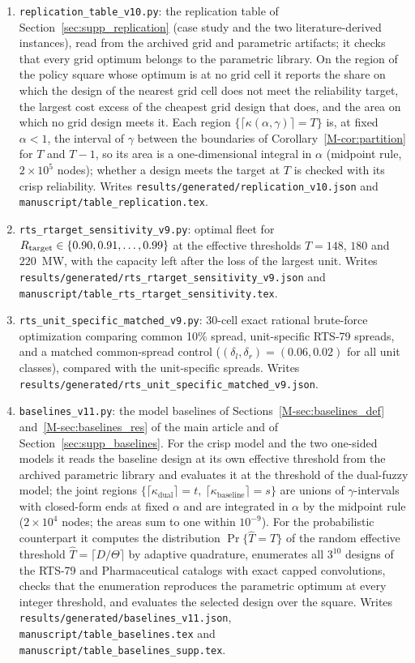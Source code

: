 \documentclass[11pt]{article}
\newcommand{\new}[1]{#1}
\begin{document}
\begin{enumerate}
\item \texttt{replication\_table\_v10.py}: the replication table of Section~\ref{sec:supp_replication} (case study and the two literature-derived instances), read from the archived grid and parametric artifacts; it checks that every grid optimum belongs to the parametric library. On the region of the policy square whose optimum is at no grid cell it reports the share on which the design of the nearest grid cell does not meet the reliability target, the largest cost excess of the cheapest grid design that does, and the area on which no grid design meets it. Each region $\{\lceil\kappa(\alpha,\gamma)\rceil = T\}$ is, at fixed $\alpha<1$, the interval of $\gamma$ between the boundaries of Corollary~\ref*{M-cor:partition} for $T$ and $T-1$, so its area is a one-dimensional integral in $\alpha$ (midpoint rule, $2\times10^5$ nodes); whether a design meets the target at $T$ is checked with its crisp reliability. Writes \texttt{results/generated/replication\_v10.json} and \texttt{manuscript/table\_replication.tex}.
\item \new{\texttt{rts\_rtarget\_sensitivity\_v9.py}: optimal fleet for $R_{\mathrm{target}} \in \{0.90, 0.91, \dots, 0.99\}$ at the effective thresholds $T = 148$, $180$ and $220$~MW, with the capacity left after the loss of the largest unit. Writes \texttt{results/generated/rts\_rtarget\_sensitivity\_v9.json} and \texttt{manuscript/table\_rts\_rtarget\_sensitivity.tex}.}
\item \new{\texttt{rts\_unit\_specific\_matched\_v9.py}: 30-cell exact rational brute-force optimization comparing common 10\% spread, unit-specific RTS-79 spreads, and a matched common-spread control ($(\delta_l,\delta_r) = (0.06, 0.02)$ for all unit classes), compared with the unit-specific spreads. Writes \texttt{results/generated/rts\_unit\_specific\_matched\_v9.json}.}
\item \texttt{baselines\_v11.py}: the model baselines of Sections~\ref*{M-sec:baselines_def} and~\ref*{M-sec:baselines_res} of the main article and of Section~\ref{sec:supp_baselines}. For the crisp model and the two one-sided models it reads the baseline design at its own effective threshold from the archived parametric library and evaluates it at the threshold of the dual-fuzzy model; the joint regions $\{\lceil\kappa_{\mathrm{dual}}\rceil = t,\ \lceil\kappa_{\mathrm{baseline}}\rceil = s\}$ are unions of $\gamma$-intervals with closed-form ends at fixed $\alpha$ and are integrated in $\alpha$ by the midpoint rule ($2\times10^4$ nodes; the areas sum to one within $10^{-9}$). For the probabilistic counterpart it computes the distribution $\Pr\{\hat{T}=T\}$ of the random effective threshold $\hat{T}=\lceil D/\Theta\rceil$ by adaptive quadrature, enumerates all $3^{10}$ designs of the RTS-79 and Pharmaceutical catalogs with exact capped convolutions, checks that the enumeration reproduces the parametric optimum at every integer threshold, and evaluates the selected design over the square. Writes \texttt{results/generated/baselines\_v11.json}, \texttt{manuscript/table\_baselines.tex} and \texttt{manuscript/table\_baselines\_supp.tex}.

\end{enumerate}
\end{document}
